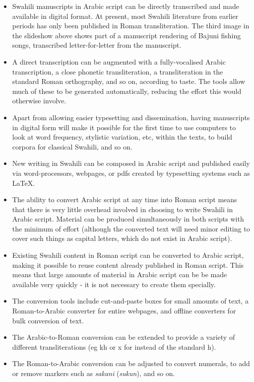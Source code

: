 \documentclass[a4paper,10pt, oneside]{book}
\newcommand\AS[1]{{\citationfont\RLE{#1}}}
\begin{document}
\begin{itemize}
 \item Swahili manuscripts in Arabic script can be directly transcribed and made available in digital format. At present, most Swahili literature from earlier periods has only been published in Roman transliteration. The third image in the slideshow above shows part of a manuscript rendering of Bajuni fishing songs, transcribed letter-for-letter from the manuscript.

 \item A direct transcription can be augmented with a fully-vocalised Arabic transcription, a close phonetic transliteration, a transliteration in the standard Roman orthography, and so on, according to taste. The tools allow much of these to be generated automatically, reducing the effort this would otherwise involve.

 \item Apart from allowing easier typesetting and dissemination, having manuscripts in digital form will make it possible for the first time to use computers to look at word frequency, stylistic variation, etc, within the texts, to build corpora for classical Swahili, and so on.

 \item New writing in Swahili can be composed in Arabic script and published easily via word-processors, webpages, or pdfs created by typesetting systems such as LaTeX.

 \item The ability to convert Arabic script at any time into Roman script means that there is very little overhead involved in choosing to write Swahili in Arabic script. Material can be produced simultaneously in both scripts with the minimum of effort (although the converted text will need minor editing to cover such things as capital letters, which do not exist in Arabic script).

 \item Existing Swahili content in Roman script can be converted to Arabic script, making it possible to reuse content already published in Roman script. This means that large amounts of material in Arabic script can be be made available very quickly - it is not necessary to create them specially.

 \item The conversion tools include cut-and-paste boxes for small amounts of text, a Roman-to-Arabic converter for entire webpages, and offline converters for bulk conversion of text.

 \item The Arabic-to-Roman conversion can be extended to provide a variety of different transliterations (eg kh or x for \AS{خ} instead of the standard h).

 \item The Roman-to-Arabic conversion can be adjusted to convert numerals, to add or remove markers such as \textit{sakani} (\textit{sukun}), and so on.
\end{itemize}
\end{document}
